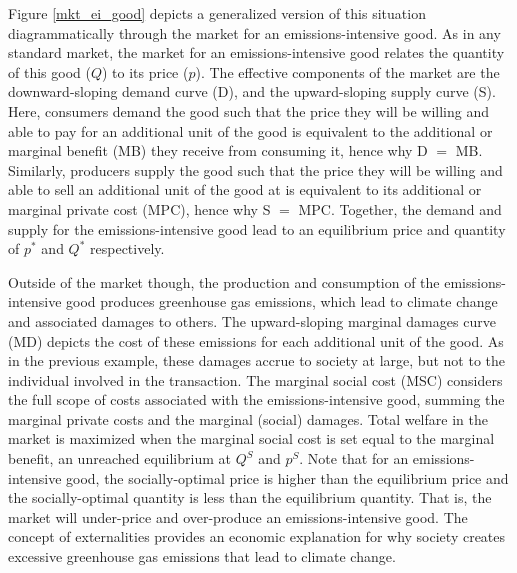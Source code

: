 Figure \ref{mkt_ei_good} depicts a generalized version of this situation diagrammatically through the market for an emissions-intensive good. As in any standard market, the market for an emissions-intensive good relates the quantity of this good ($Q$) to its price ($p$). The effective components of the market are the downward-sloping demand curve (D), and the upward-sloping supply curve (S). Here, consumers demand the good such that the price they will be willing and able to pay for an additional unit of the good is equivalent to the additional or marginal benefit (MB) they receive from consuming it, hence why D $=$ MB. Similarly, producers supply the good such that the price they will be willing and able to sell an additional unit of the good at is equivalent to its additional or marginal private cost (MPC), hence why S $=$ MPC. Together, the demand and supply for the emissions-intensive good lead to an equilibrium price and quantity of $p^*$ and $Q^*$ respectively. 

Outside of the market though, the production and consumption of the emissions-intensive good produces greenhouse gas emissions, which lead to climate change and associated damages to others. The upward-sloping marginal damages curve (MD) depicts the cost of these emissions for each additional unit of the good. As in the previous example, these damages accrue to society at large, but not to the individual involved in the transaction. The marginal social cost (MSC) considers the full scope of costs associated with the emissions-intensive good, summing the marginal private costs and the marginal (social) damages. Total welfare in the market is maximized when the marginal social cost is set equal to the marginal benefit, an unreached equilibrium at $Q^S$ and $p^S$. Note that for an emissions-intensive good, the socially-optimal price is higher than the equilibrium price and the socially-optimal quantity is less than the equilibrium quantity. That is, the market will under-price and over-produce an emissions-intensive good. The concept of externalities provides an economic explanation for why society creates excessive greenhouse gas emissions that lead to climate change. 


